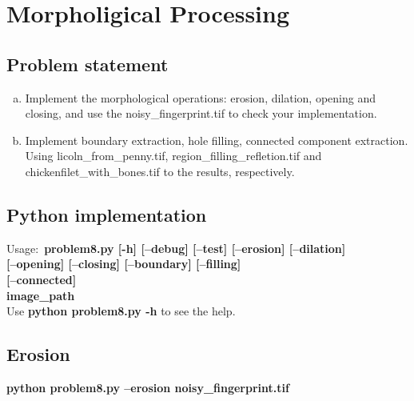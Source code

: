 \chapter{Morpholigical Processing}

\section{Problem statement}

\begin{enumerate}[(a)]
    \item Implement the morphological operations: erosion, dilation,
    opening and closing, and use the noisy\_fingerprint.tif to check
    your implementation.

    \item Implement boundary extraction, hole filling, connected component extraction.
    Using licoln\_from\_penny.tif, region\_filling\_refletion.tif and chickenfilet\_with\_bones.tif to
    the results, respectively.
\end{enumerate}

\section{Python implementation}

Usage:~\textbf{problem8.py [-h] [--debug] [--test] [--erosion] [--dilation]} \\
\textbf{[--opening] [--closing] [--boundary] [--filling]} \\
\textbf{[--connected]} \\
\textbf{image\_path} \\

Use \textbf{python problem8.py -h} to see the help.

\pagebreak


\pagebreak

\section{Erosion}

\textbf{python problem8.py --erosion noisy\_fingerprint.tif}

